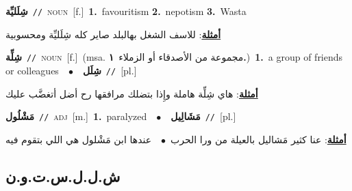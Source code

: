 \documentclass[10pt,a4paper,twoside]{article} %
\begin{document}
\begin{multicols}{2}
{\setlength\topsep{0pt}\textbf{\foreignlanguage{arabic}{شِلَليِّة}}\ {\color{gray}\texttt{//}\color{black}}\ \textsc{noun}\ [f.]\ \textbf{1.}~favouritism  \textbf{2.}~nepotism  \textbf{3.}~Wasta\  \begin{flushright}\color{gray}\foreignlanguage{arabic}{\textbf{\underline{\foreignlanguage{arabic}{أمثلة}}}: للاسف الشغل بهالبلد صاير كله شِلَليِّة ومحسوبية}\end{flushright}\color{black}} \vspace{2mm}

{\setlength\topsep{0pt}\textbf{\foreignlanguage{arabic}{شِلِّة}}\ {\color{gray}\texttt{//}\color{black}}\ \textsc{noun}\ [f.]\ \color{gray}(msa. \foreignlanguage{arabic}{مجموعة من الأصدقاء أو الزملاء}~\foreignlanguage{arabic}{\textbf{١.}})\color{black}\ \textbf{1.}~a group of friends or colleagues\ \ $\bullet$\ \ \setlength\topsep{0pt}\textbf{\foreignlanguage{arabic}{شِلَل}}\ {\color{gray}\texttt{//}\color{black}}\ [pl.]\  \begin{flushright}\color{gray}\foreignlanguage{arabic}{\textbf{\underline{\foreignlanguage{arabic}{أمثلة}}}: هاي شِلِّة هاملة وإِذا بتضلك مرافقها رح أضل أتغضَّب عليك}\end{flushright}\color{black}} \vspace{2mm}

{\setlength\topsep{0pt}\textbf{\foreignlanguage{arabic}{مَشْلُول}}\ {\color{gray}\texttt{//}\color{black}}\ \textsc{adj}\ [m.]\ \textbf{1.}~paralyzed\ \ $\bullet$\ \ \setlength\topsep{0pt}\textbf{\foreignlanguage{arabic}{مَشَالِيل}}\ {\color{gray}\texttt{//}\color{black}}\ [pl.]\  \begin{flushright}\color{gray}\foreignlanguage{arabic}{\textbf{\underline{\foreignlanguage{arabic}{أمثلة}}}: عنا كثير مَشاليل بالعيلة من ورا الحرب\ $\bullet$\ \  عندها ابن مَشْلول هي اللي بتقوم فيه}\end{flushright}\color{black}} \vspace{2mm}

\vspace{-3mm}
\subsection*{\color{blue}\foreignlanguage{arabic}{ش.ل.ل.س.ت.و.ن}\color{blue}{ (ntws)}} 


\end{multicols}
\end{document}
